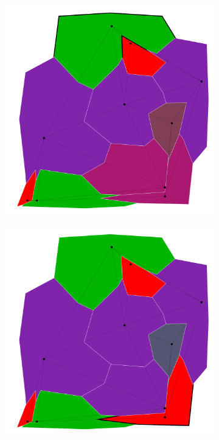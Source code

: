\documentclass{article}
\begin{document}
\begin{figure}[h!]
\begin{subfigure}{0.18\textwidth}
				\caption{}
			\end{subfigure}
			\;
			\begin{subfigure}{0.18\textwidth}
				\centering
				\includegraphics[width=\textwidth]{images/sequences/mac_backtracking/bt_mac_I00008}
				\caption{}
			\end{subfigure}
			\;
			\begin{subfigure}{0.18\textwidth}
				\centering
				\includegraphics[width=\textwidth]{images/sequences/mac_backtracking/bt_mac_I00010}
				\caption{}
			\end{subfigure} \\
			

\end{figure}
\end{document}
